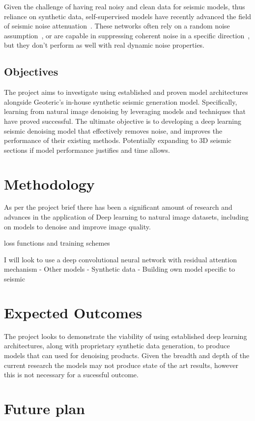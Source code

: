 \documentclass[project-plan]{report-template}
\begin{document}
Given the challenge of having real noisy and clean data for seismic models, thus reliance on synthetic data, self-supervised models have recently advanced the field of seismic noise attenuation~\cite{liu2023tracewise}. These networks often rely on a random noise assumption~\cite{birnie2021potential}, or are capable in suppressing coherent noise in  a specific direction~\cite{liu2023tracewise}, but they don't perform as well with real dynamic noise properties.


\subsection{Objectives}
The project aims to investigate using established and proven model architectures alongside Geoteric's in-house synthetic seismic generation model. Specifically, learning from natural image denoising by leveraging models and techniques that have proved successful. The ultimate objective is to developing a deep learning seismic denoising model that effectively removes noise, and improves the performance of their existing methods. Potentially expanding to 3D seismic sections if model performance justifies and time allows.


\section{Methodology}
As per the project brief there has been a significant amount of research and advances in the application of Deep learning to natural image datasets, including on models to denoise and improve image quality.

loss functions and training schemes

I will look to use a deep convolutional neural network with residual attention mechanism
- Other models
- Synthetic data
- Building own model specific to seismic


\section{Expected Outcomes}
The project looks to demonstrate the viability of using established deep learning architectures, along with proprietary synthetic data generation, to produce models that can used for denoising products. Given the breadth and depth of the current research the models may not produce state of the art results, however this is not necessary for a sucessful outcome.


\section{Future plan}




\end{document}
